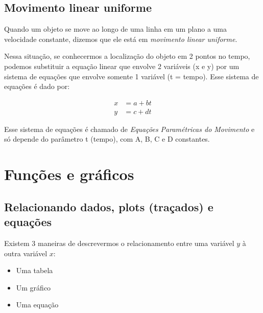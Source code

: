 \documentclass[pdftex, brazil, 12pt, twoside]{article}
\begin{document}
\subsection{Movimento linear uniforme}
\label{modelagem-linear-movimento-uniforme}

Quando um objeto se move ao longo de uma linha em um plano a uma velocidade constante,
dizemos que ele está em \emph{movimento linear uniforme}.

Nessa situação, se
conhecermos a localização do objeto em 2 pontos no tempo, podemos substituir a equação
linear que envolve 2 variáveis (x e y) por um sistema de equações que envolve somente 1
variável (t = tempo). Esse sistema de equações é dado por:

\begin{equation}
  \begin{split}
    x &= a + bt\\
    y &= c + dt
  \end{split}
\end{equation}

Esse sistema de equações é chamado de \emph{Equações Paramétricas do Movimento} e só
depende do parâmetro t (tempo), com A, B, C e D constantes.


\section{Funções e gráficos}
\label{funcoes-graficos}

\subsection{Relacionando dados, plots (traçados) e equações}
\label{funcoes-graficos-relacionando}

Existem 3 maneiras de descrevermos o relacionamento entre uma variável $y$ à
outra variável $x$:

\begin{itemize}[noitemsep]
\item Uma tabela
\item Um gráfico
\item Uma equação
\end{itemize}
\end{document}
